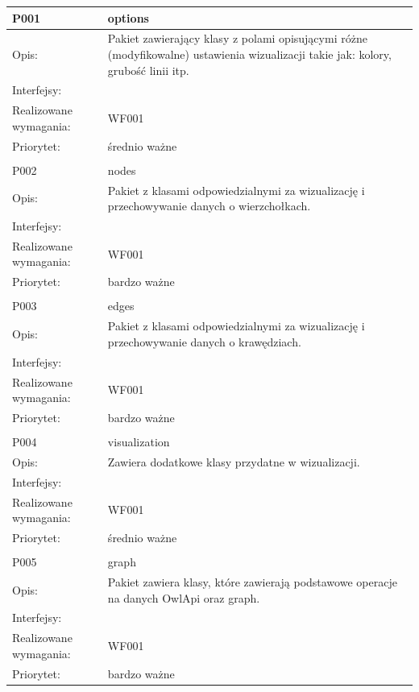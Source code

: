 \documentclass[a4paper,10pt]{article}
\begin{document}
\begin{center}
\begin{longtable}{|m{3cm}|m{9cm}|} \hline

P001 & options\\ \hline
Opis: & Pakiet zawierający klasy z polami opisującymi różne (modyfikowalne) ustawienia wizualizacji takie jak: kolory, grubość linii itp.     \\ \hline
Interfejsy: &     \\ \hline
Realizowane wymagania: & WF001 \\ \hline
Priorytet: & średnio ważne \\ \hline

\multicolumn{2}{c}{} \\
 \hline

P002 & nodes\\ \hline
Opis: & Pakiet z klasami odpowiedzialnymi za wizualizację i przechowywanie danych o wierzchołkach.    \\ \hline
Interfejsy: &     \\ \hline
Realizowane wymagania: & WF001 \\ \hline
Priorytet: & bardzo ważne \\ \hline

\multicolumn{2}{c}{} \\
 \hline

P003 & edges\\ \hline
Opis: & Pakiet z klasami odpowiedzialnymi za wizualizację i przechowywanie danych o krawędziach.    \\ \hline
Interfejsy: &     \\ \hline
Realizowane wymagania: & WF001 \\ \hline
Priorytet: & bardzo ważne \\ \hline

\multicolumn{2}{c}{} \\
 \hline

P004 & visualization\\ \hline
Opis: & Zawiera dodatkowe klasy przydatne w wizualizacji.\\ \hline
Interfejsy: &     \\ \hline
Realizowane wymagania: & WF001 \\ \hline
Priorytet: & średnio ważne \\ \hline

\multicolumn{2}{c}{} \\
 \hline

P005 & graph\\ \hline
Opis: & Pakiet zawiera klasy, które zawierają podstawowe operacje na danych OwlApi oraz graph. \\ \hline
Interfejsy: &     \\ \hline
Realizowane wymagania: & WF001 \\ \hline
Priorytet: & bardzo ważne \\ \hline


\end{longtable}

\end{center}
\end{document}
